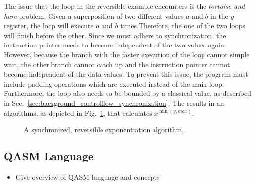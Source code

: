 The issue that the loop in the reversible example encounters is the \emph{tortoise and hare} problem. Given a superposition of two different values $a$ and $b$ in the $y$ register, the loop will execute $a$ and $b$ times.Therefore, the one of the two loops will finish before the other. Since we must adhere to synchronization, the instruction pointer needs to become independent of the two values again. However, because the branch with the faster execution of the loop cannot simple wait, the other branch cannot catch up and the instruction pointer cannot become independent of the data values. 
To prevent this issue, the program must include padding operations which are executed instead of the main loop. Furthermore, the loop also needs to be bounded by a classical value, as described in Sec.~\ref{sec:background_controlflow_synchronization}. The results in an algorithms, as depicted in Fig.~\ref{fig:qcm_sync}, that calculates $x^{\min{(y, max)}}$.

\begin{figure}[htp]
    \centering     
    
    \caption{A synchronized, reversible exponentiation algorithm.}
    \label{fig:qcm_sync}
\end{figure}

\subsection{QASM Language}
\label{sec:background_qasm}
\begin{itemize}
    \item Give overview of QASM language and concepts
\end{itemize}